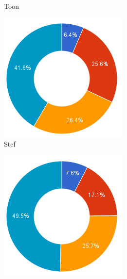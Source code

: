 \documentclass[i2]{oss}
\begin{document}
\begin{figure}[h!]
\begin{subfigure}[hb]{0.20\textwidth}
                \caption{Toon}
        \end{subfigure}%
        \begin{subfigure}[hb]{0.20\textwidth}
                \centering
                \includegraphics[width=\textwidth]{chart_4}
                \caption{Stef}
        \end{subfigure}%
        \begin{subfigure}[hb]{0.20\textwidth}
                \centering
                \includegraphics[width=\textwidth]{chart_5}

\end{subfigure}
\end{figure}
\end{document}
